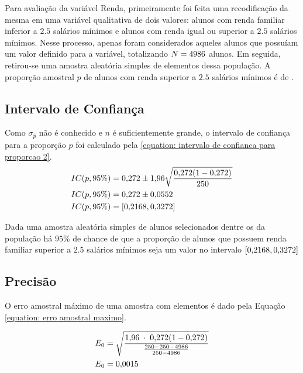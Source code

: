 

Para avaliação da variável Renda, primeiramente foi feita uma recodificação
da mesma em uma variável qualitativa de dois valores: alunos com renda
familiar inferior a $\num{2,5}$ salários mínimos e alunos com renda igual ou
superior a $\num{2,5}$ salários mínimos. Nesse processo, apenas foram considerados
aqueles alunos que possuíam um valor definido para a variável, totalizando
$N=4986$ alunos. Em seguida, retirou-se uma amostra aleatória simples de
\SEISn elementos dessa população. A proporção amostral $\hat{p}$ de alunos
com renda superior a $\num{2.5}$ salários mínimos é de \SEISpAmostral.

\subsection{Intervalo de Confiança}

	Como $\sigma_{\hat{p}}$ não é conhecido e $n$ é suficientemente grande,
	o intervalo de confiança para a proporção $p$ foi calculado pela
	\autoref{equation: intervalo de confianca para proporcao 2}.
	\begin{align*}
		IC(p, 95\%) &= \num{0.272} \pm \num{1.96} \sqrt{\frac{\num{0.272} (1- \num{0.272})}{250}} \\
		IC(p, 95\%) &= \num{0.272} \pm \num{0.0552} \\
		IC(p, 95\%) &= [\num{0.2168}, \num{0.3272}]
	\end{align*}

	Dada uma amostra aleatória simples de \SEISn alunos
	selecionados dentre os \SEISN da população há $95\%$ de chance de que a
	proporção de alunos que possuem renda familiar superior a $\num{2,5}$ salários
	mínimos seja um valor no intervalo $[\num{0.2168}, \num{0.3272}]$

\subsection{Precisão}

	O erro amostral máximo de uma amostra com \SEISn elementos é dado pela
	Equação \ref{equation: erro amostral maximo}.

	\begin{align}
		E_0 &= \sqrt{\frac{\num{1.96} \;\cdot\; \num{0.272} (1 - \num{0.272}) }{\frac{250 - 250 \;\cdot\; 4986}{250 - 4986}}} \nonumber \\
		E_0 &= \num{0.0015} \nonumber
	\end{align}

